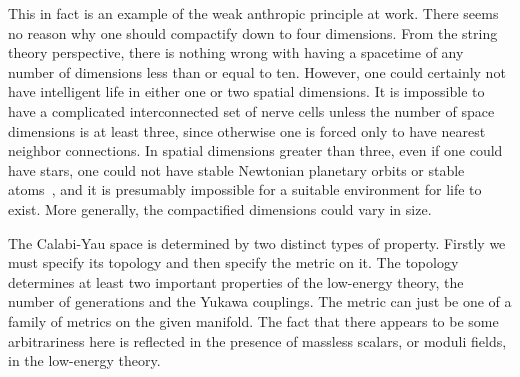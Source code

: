 \documentclass{article}
\begin{document}
This in fact is an example of the weak anthropic principle at work.
There seems no reason why one should compactify down to 
four dimensions. From the string theory perspective, 
there is nothing wrong with having
a spacetime of any number of dimensions less than or equal to ten.
However, one could certainly not have intelligent life in either one or
two spatial dimensions. It is impossible to have a complicated
interconnected set of nerve cells unless the number of space dimensions
is at least three, since otherwise one is forced only to have nearest
neighbor connections. In spatial dimensions greater than three, even if
one could have stars, one could not have stable Newtonian planetary
orbits or stable atoms~\cite{PE:stable}, and it is presumably impossible
for a suitable environment for life to exist. More generally, the
compactified dimensions could vary in size.

The Calabi-Yau space is determined by two distinct types of property.
Firstly we must specify its topology and then  specify the metric on it.
The topology determines at least two important properties of the low-energy
theory, the number of generations and the Yukawa couplings. The metric
can just be one of a family of metrics on the given manifold. The fact
that there appears to be some arbitrariness here is reflected in the
presence of massless scalars, or moduli fields, in the low-energy theory.
\end{document}
